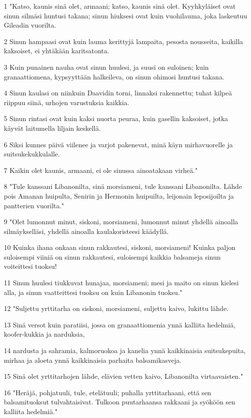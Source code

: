 \par 1 "Katso, kaunis sinä olet, armaani; katso, kaunis sinä olet. Kyyhkyläiset ovat sinun silmäsi huntusi takana; sinun hiuksesi ovat kuin vuohilauma, joka laskeutuu Gileadin vuorilta.
\par 2 Sinun hampaasi ovat kuin lauma kerittyjä lampaita, pesosta nousseita, kaikilla kaksoiset, ei yhtäkään karitsatonta.
\par 3 Kuin punainen nauha ovat sinun huulesi, ja suusi on suloinen; kuin granaattiomena, kypsyyttään halkeileva, on sinun ohimosi huntusi takana.
\par 4 Sinun kaulasi on niinkuin Daavidin torni, linnaksi rakennettu; tuhat kilpeä riippuu siinä, urhojen varustuksia kaikkia.
\par 5 Sinun rintasi ovat kuin kaksi nuorta peuraa, kuin gasellin kaksoiset, jotka käyvät laitumella liljain keskellä.
\par 6 Siksi kunnes päivä viilenee ja varjot pakenevat, minä käyn mirhavuorelle ja suitsukekukkulalle.
\par 7 Kaikin olet kaunis, armaani, ei ole sinussa ainoatakaan virheä."
\par 8 "Tule kanssani Libanonilta, sinä morsiameni, tule kanssani Libanonilta. Lähde pois Amanan huipulta, Senirin ja Hermonin huipuilta, leijonain leposijoilta ja pantterien vuorilta."
\par 9 "Olet lumonnut minut, siskoni, morsiameni, lumonnut minut yhdellä ainoalla silmäykselläsi, yhdellä ainoalla kaulakoristeesi käädyllä.
\par 10 Kuinka ihana onkaan sinun rakkautesi, siskoni, morsiameni! Kuinka paljon suloisempi viiniä on sinun rakkautesi, suloisempi kaikkia balsameja sinun voiteittesi tuoksu!
\par 11 Sinun huulesi tiukkuvat hunajaa, morsiameni; mesi ja maito on sinun kielesi alla, ja sinun vaatteittesi tuoksu on kuin Libanonin tuoksu."
\par 12 "Suljettu yrttitarha on siskoni, morsiameni, suljettu kaivo, lukittu lähde.
\par 13 Sinä versot kuin paratiisi, jossa on granaattiomenia ynnä kalliita hedelmiä, koofer-kukkia ja narduksia,
\par 14 nardusta ja sahramia, kalmoruokoa ja kanelia ynnä kaikkinaisia suitsukepuita, mirhaa ja aloeta ynnä kaikkinaisia parhaita balsamikasveja.
\par 15 Sinä olet yrttitarhojen lähde, elävien vetten kaivo, Libanonilta virtaavaisten."
\par 16 "Heräjä, pohjatuuli, tule, etelätuuli; puhalla yrttitarhaani, että sen balsamituoksut tulvahtaisivat. Tulkoon puutarhaansa rakkaani ja syököön sen kalliita hedelmiä."

